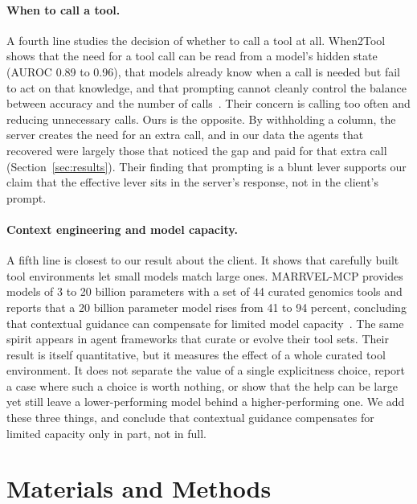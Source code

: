 \documentclass[sigconf]{ceurart}
\begin{document}
\paragraph{When to call a tool.}
A fourth line studies the decision of whether to call a tool at all. When2Tool
shows that the need for a tool call can be read from a model's hidden state (AUROC
0.89 to 0.96), that models already know when a call is needed but fail to act on
that knowledge, and that prompting cannot cleanly control the balance between
accuracy and the number of calls~\cite{sun2026llmagentsknowtools}. Their concern is calling
too often and reducing unnecessary calls. Ours is the opposite. By withholding a
column, the server creates the need for an extra call, and in our data the agents
that recovered were largely those that noticed the gap and paid for that extra call
(Section~\ref{sec:results}). Their finding that prompting is a blunt lever supports
our claim that the effective lever sits in the server's response, not in the
client's prompt.

\paragraph{Context engineering and model capacity.}
A fifth line is closest to our result about the client. It shows that carefully
built tool environments let small models match large ones. MARRVEL-MCP provides
models of 3 to 20 billion parameters with a set of 44 curated genomics tools and
reports that a 20 billion parameter model rises from 41 to 94 percent, concluding
that contextual guidance can compensate for limited model
capacity~\cite{everton2026marrvelmcp}. The same spirit appears in agent frameworks
that curate or evolve their tool sets. Their result is itself quantitative, but it
measures the effect of a whole curated tool environment. It does not separate the
value of a single explicitness choice, report a case where such a choice is worth
nothing, or show that the help can be large yet still leave a lower-performing
model behind a higher-performing one. We add these three things, and conclude that
contextual guidance compensates for limited capacity only in part, not in full.

\section{Materials and Methods}
\end{document}
